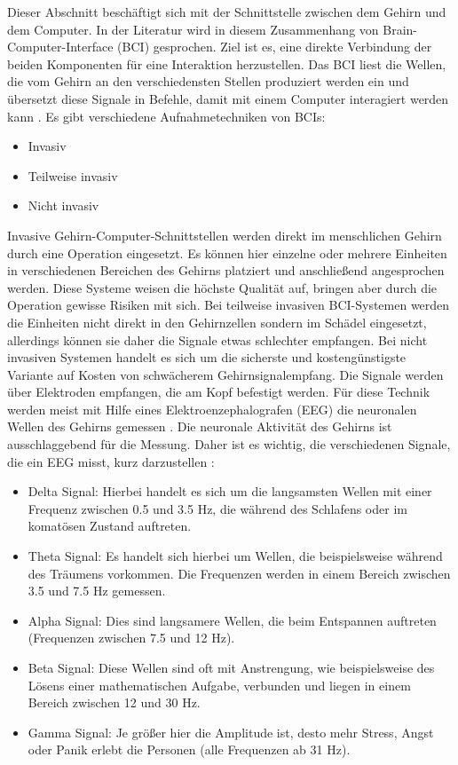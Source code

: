 Dieser Abschnitt beschäftigt sich mit der Schnittstelle zwischen dem Gehirn und dem Computer. In der Literatur wird in diesem Zusammenhang von Brain-Computer-Interface (BCI) gesprochen. Ziel ist es, eine direkte Verbindung der beiden Komponenten für eine Interaktion herzustellen. Das BCI liest die Wellen, die vom Gehirn an den verschiedensten Stellen produziert werden ein und übersetzt diese Signale in Befehle, damit mit einem Computer interagiert werden kann \cite{BRAIN}.
\newline \newline
Es gibt verschiedene Aufnahmetechniken von BCIs:
\begin{itemize}
      \item Invasiv
      \item Teilweise invasiv
			\item Nicht invasiv
\end{itemize}
\vspace{\baselineskip}
Invasive Gehirn-Computer-Schnittstellen werden direkt im menschlichen Gehirn durch eine Operation eingesetzt. Es können hier einzelne oder mehrere Einheiten in verschiedenen Bereichen des Gehirns platziert und anschließend angesprochen werden. Diese Systeme weisen die höchste Qualität auf, bringen aber durch die Operation gewisse Risiken mit sich.
Bei teilweise invasiven BCI-Systemen werden die Einheiten nicht direkt in den Gehirnzellen sondern im Schädel eingesetzt, allerdings können sie daher die Signale etwas schlechter empfangen. Bei nicht invasiven Systemen handelt es sich um die sicherste und kostengünstigste Variante auf Kosten von schwächerem Gehirnsignalempfang. Die Signale werden über Elektroden empfangen, die am Kopf befestigt werden. Für diese Technik werden meist mit Hilfe eines Elektroenzephalografen (EEG) die neuronalen Wellen des Gehirns gemessen \cite{BRAIN}.
\newline \newline 
Die neuronale Aktivität des Gehirns ist ausschlaggebend für die Messung. Daher ist es wichtig, die verschiedenen Signale, die ein EEG misst, kurz darzustellen \cite{BRAIN}:
\begin{itemize}
      \item Delta Signal: Hierbei handelt es sich um die langsamsten Wellen mit einer Frequenz zwischen 0.5 und 3.5 Hz, die während des Schlafens oder im komatösen Zustand auftreten.
      \item Theta Signal: Es handelt sich hierbei um Wellen, die beispielsweise während des Träumens vorkommen. Die Frequenzen werden in einem Bereich zwischen 3.5 und 7.5 Hz gemessen.
			\item Alpha Signal: Dies sind langsamere Wellen, die beim Entspannen auftreten (Frequenzen zwischen 7.5 und 12 Hz).
			\item Beta Signal: Diese Wellen sind oft mit Anstrengung, wie beispielsweise des Lösens einer mathematischen Aufgabe, verbunden und liegen in einem Bereich zwischen 12 und 30 Hz.
      \item Gamma Signal: Je größer hier die Amplitude ist, desto mehr Stress, Angst oder Panik erlebt die Personen (alle Frequenzen ab 31 Hz).
\end{itemize}
